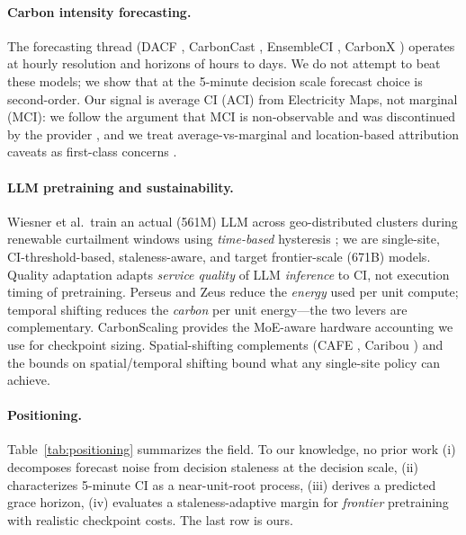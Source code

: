 \documentclass[sigconf,nonacm=false]{acmart}
\begin{document}
\paragraph{Carbon intensity forecasting.}
The forecasting thread (DACF \cite{maji2022dacf}, CarbonCast
\cite{maji2023carboncast}, EnsembleCI \cite{yan2025ensembleci}, CarbonX
\cite{maji2025carbonx}) operates at hourly resolution and horizons of hours to
days. We do not attempt to beat these models; we show that at the 5-minute
decision scale forecast choice is second-order. Our signal is average CI (ACI)
from Electricity Maps, not marginal (MCI): we follow the argument that MCI is
non-observable and was discontinued by the provider
\cite{wiesner2025beyondmci}, and we treat average-vs-marginal and
location-based attribution caveats as first-class concerns
\cite{sukprasert2024avm,maji2024greenmirage,maji2024untangling}.

\paragraph{LLM pretraining and sustainability.}
Wiesner et al.\ train an actual (561M) LLM across geo-distributed clusters
during renewable curtailment windows using \emph{time-based} hysteresis
\cite{wiesner2026curtailment}; we are single-site, CI-threshold-based,
staleness-aware, and target frontier-scale (671B) models. Quality adaptation
\cite{wiesner2025qora} adapts \emph{service quality} of LLM \emph{inference} to
CI, not execution timing of pretraining. Perseus \cite{chung2024perseus} and
Zeus \cite{you2022zeus} reduce the \emph{energy} used per unit compute;
temporal shifting reduces the \emph{carbon} per unit energy---the two levers are
complementary. CarbonScaling \cite{jiang2025carbonscaling} provides the
MoE-aware hardware accounting we use for checkpoint sizing. Spatial-shifting
complements (CAFE \cite{bian2024cafe}, Caribou \cite{gsteiger2024caribou}) and
the bounds on spatial/temporal shifting \cite{sukprasert2024limitations} bound
what any single-site policy can achieve.

\paragraph{Positioning.}
Table~\ref{tab:positioning} summarizes the field. To our knowledge, no prior work (i) decomposes
forecast noise from decision staleness at the decision scale, (ii) characterizes
5-minute CI as a near-unit-root process, (iii) derives a predicted grace
horizon, (iv) evaluates a staleness-adaptive margin for \emph{frontier}
pretraining with realistic checkpoint costs. The last row is ours.
\end{document}
